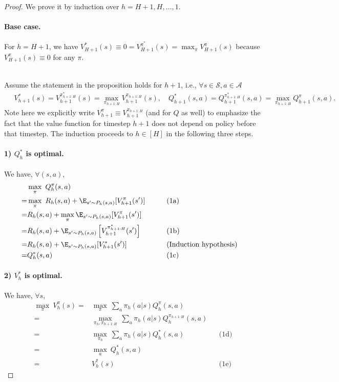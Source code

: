 \begin{proof}
We prove it by induction over $h=H+1,H,\ldots,1$.

\paragraph{Base case.} For $h=H+1$, we have $V^*_{H+1}(s)\equiv0=V^{\pi^*}_{H+1}(s)=\max _\pi V_{H+1}^\pi(s)$ because $V^\pi_{H+1}(s)\equiv0$ for any $\pi$.

~\\
Assume the statement in the proposition holds for $h+1$, i.e.,
$\forall s\in\mathcal{S}, a\in\mathcal{A}$
\begin{align*}
    \quad V_{h+1}^*(s)=V^{\pi^*_{h+1:H}}_{h+1}(s)=\max _{\pi_{h+1:H}} V_{h+1}^{\pi_{h+1:H}}(s), \quad Q_{h+1}^*(s, a)=Q^{\pi^*_{h+1:H}}_{h+1}(s,a)=\max_{\pi_{h+1:H}} Q_{h+1}^\pi(s, a)
    .
\end{align*}
Note here we explicitly write $V^\pi_{h+1}\equiv V^{\pi_{h+1:H}}_{h+1}$ (and for $Q$ as well) to emphasize the fact that the value function for timestep $h+1$ does not depend on policy before that timestep.
The induction proceeds to $h\in[H]$ in the following three steps.
\paragraph{1) $Q^*_h$ is optimal.}
We have, $\forall (s,a)$, 
\begin{align*}
&\max_\pi ~ Q_h^\pi(s, a) \\
=&\max _\pi ~ R_h(s, a)+\E_{s'\sim P_h(s, a)} [V_{h+1}^\pi(s')] \qquad&&\text{(1a)}\\
=&R_h(s, a)+\max _\pi \E_{s'\sim P_h(s, a)} [V_{h+1}^\pi(s')] \\
=&R_h(s, a)+\E_{s'\sim P_h(s, a)} \left[V_{h+1}^{\pi^*_{h+1:H}}(s')\right] \qquad&&\text{(1b)}\\
=&R_h(s, a)+\E_{s'\sim P_h(s, a)} [V_{h+1}^*(s')] \qquad&&\text{(Induction hypothesis)}\\
=&Q_h^*(s, a) \qquad&&\text{(1c)}
\end{align*}

\paragraph{2) $V^*_h$ is optimal.}
We have, $\forall s$, 
\begin{align*}
\max_\pi ~V_h^\pi(s)
=&\max_\pi ~\sum_a \pi_h(a | s) Q_h^\pi(s, a) \\
=&\max_{\pi_h, \pi_{h+1: H}} ~\sum_a \pi_h(a | s) Q_h^{\pi_{h+1: H}}(s, a)\\ 
=&\max_{\pi_h} ~\sum_a \pi_h(a | s) Q_h^*(s, a)  \qquad&&\text{(1d)}  \\
=&\max_a ~Q^*_h(s,a) \\
=&V^*_h(s) \qquad&&\text{(1e)}
\end{align*}


\end{proof}

